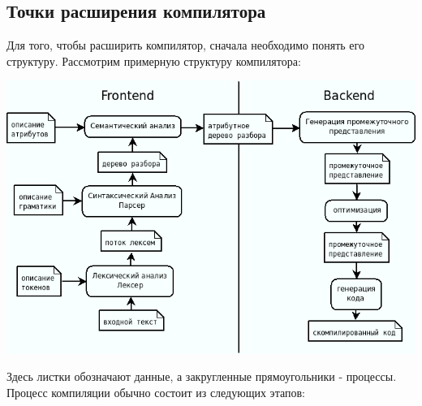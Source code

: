 \documentclass[a4paper,12pt,titlepage]{extarticle}
\begin{document}
\subsection{Точки расширения компилятора}
Для того, чтобы расширить компилятор, сначала необходимо понять его структуру.
Рассмотрим примерную структуру компилятора:
\begin{center}
 \includegraphics[scale=0.6]{img/compiler2.png}
\end{center}
Здесь листки обозначают данные, а закругленные прямоугольники - процессы.
\newline \newline
Процесс компиляции обычно состоит из следующих этапов:
\end{document}
